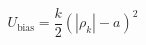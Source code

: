 \documentclass[12pt]{article}
\begin{document}
$$
   U_\text{bias} = \frac{k}{2}(|\rho_{k}| - a)^2
$$
\end{document}

